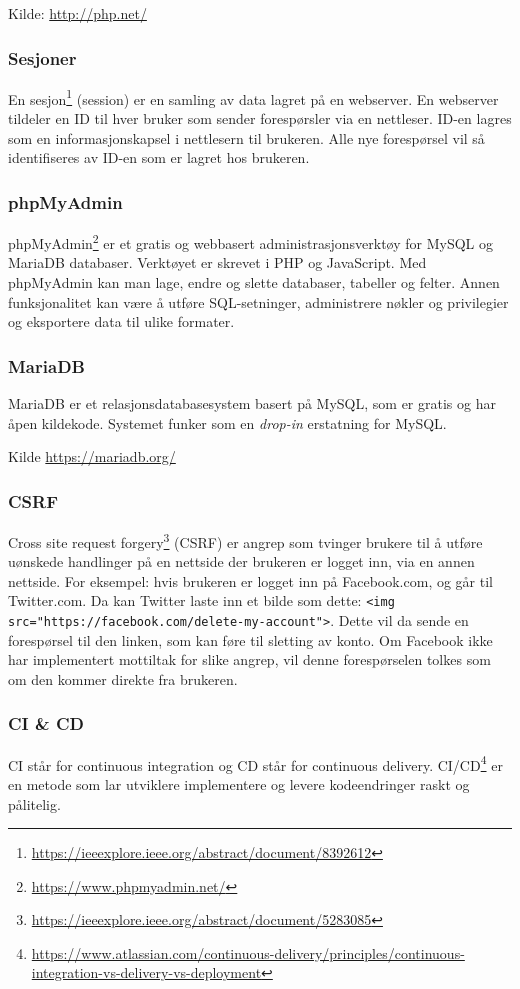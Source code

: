 Kilde: \url{http://php.net/}

\subsubsection{Sesjoner}
En sesjon\footnote{\url{https://ieeexplore.ieee.org/abstract/document/8392612}} (session) er en samling av data lagret på en webserver. En webserver tildeler en ID til hver bruker som sender forespørsler via en nettleser. ID-en lagres som en informasjonskapsel i nettlesern til brukeren. Alle nye forespørsel vil så identifiseres av ID-en som er lagret hos brukeren.

\subsubsection{phpMyAdmin}
phpMyAdmin\footnote{\url{https://www.phpmyadmin.net/}} er et gratis og webbasert administrasjonsverktøy for MySQL og MariaDB databaser. Verktøyet er skrevet i PHP og JavaScript. Med phpMyAdmin kan man lage, endre og slette databaser, tabeller og felter. Annen funksjonalitet kan være å utføre SQL-setninger, administrere nøkler og privilegier og eksportere data til ulike formater.

\subsubsection{MariaDB}
MariaDB er et relasjonsdatabasesystem basert på MySQL, som er gratis og har åpen kildekode. Systemet funker som en \textit{drop-in} erstatning for MySQL.

Kilde \url{https://mariadb.org/}

\subsubsection{CSRF}
Cross site request forgery\footnote{\url{https://ieeexplore.ieee.org/abstract/document/5283085}} (CSRF) er angrep som tvinger brukere til å utføre uønskede handlinger på en nettside der brukeren er logget inn, via en annen nettside. For eksempel: hvis brukeren er logget inn på Facebook.com, og går til Twitter.com. Da kan Twitter laste inn et bilde som dette: \lstinline{<img src="https://facebook.com/delete-my-account">}. Dette vil da sende en forespørsel til den linken, som kan føre til sletting av konto. Om Facebook ikke har implementert mottiltak for slike angrep, vil denne forespørselen tolkes som om den kommer direkte fra brukeren.

\subsubsection{CI \& CD}
CI står for continuous integration og CD står for continuous delivery. CI/CD\footnote{\url{https://www.atlassian.com/continuous-delivery/principles/continuous-integration-vs-delivery-vs-deployment}} er en metode som lar utviklere implementere og levere kodeendringer raskt og pålitelig.

